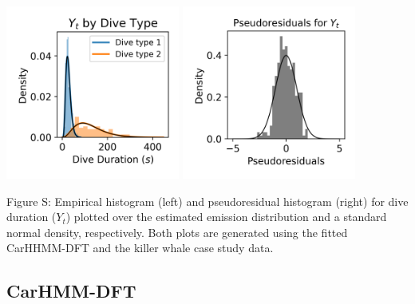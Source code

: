 \documentclass{article}
\begin{document}
        \begin{center}
        \includegraphics[width=2.25in]{../Plots/2019/20190902-182840-CATs_OB_1_0_267_CarHHMM1_empirical_hist_dive_duration.png}
        \includegraphics[width=2.25in]{../Plots/2019/20190902-182840-CATs_OB_1_0_267_CarHHMM1_pseudresids_Dive_Duration.png}
        \end{center}
        
        \noindent Figure S: Empirical histogram (left) and pseudoresidual histogram (right) for dive duration ($Y_{t}$) plotted over the estimated emission distribution and a standard normal density, respectively. Both plots are generated using the fitted CarHHMM-DFT and the killer whale case study data.
        \addtocounter{fignum}{1}
        
        \subsection{CarHMM-DFT}
        
\end{document}
